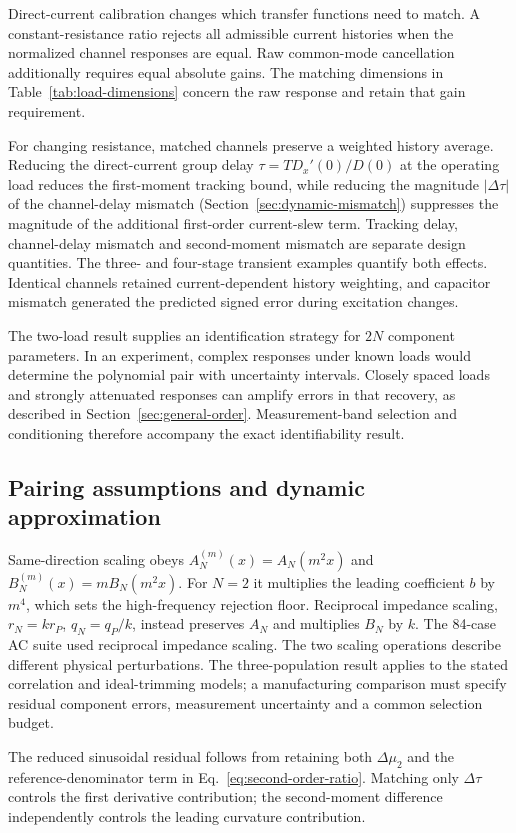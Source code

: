 Direct-current calibration changes which transfer functions need to match. A constant-resistance ratio rejects all admissible current histories when the normalized channel responses are equal. Raw common-mode cancellation additionally requires equal absolute gains. The matching dimensions in Table~\ref{tab:load-dimensions} concern the raw response and retain that gain requirement.

For changing resistance, matched channels preserve a weighted history average. Reducing the direct-current group delay $\tau=TD_x'(0)/D(0)$ at the operating load reduces the first-moment tracking bound, while reducing the magnitude $|\Delta\tau|$ of the channel-delay mismatch (Section~\ref{sec:dynamic-mismatch}) suppresses the magnitude of the additional first-order current-slew term. Tracking delay, channel-delay mismatch and second-moment mismatch are separate design quantities. The three- and four-stage transient examples quantify both effects. Identical channels retained current-dependent history weighting, and capacitor mismatch generated the predicted signed error during excitation changes.

The two-load result supplies an identification strategy for $2N$ component parameters. In an experiment, complex responses under known loads would determine the polynomial pair with uncertainty intervals. Closely spaced loads and strongly attenuated responses can amplify errors in that recovery, as described in Section~\ref{sec:general-order}. Measurement-band selection and conditioning therefore accompany the exact identifiability result.

\subsection{Pairing assumptions and dynamic approximation}

Same-direction scaling obeys $A_N^{(m)}(x)=A_N(m^2x)$ and $B_N^{(m)}(x)=mB_N(m^2x)$. For $N=2$ it multiplies the leading coefficient $b$ by $m^4$, which sets the high-frequency rejection floor. Reciprocal impedance scaling, $r_N=kr_P$, $q_N=q_P/k$, instead preserves $A_N$ and multiplies $B_N$ by $k$. The 84-case AC suite used reciprocal impedance scaling. The two scaling operations describe different physical perturbations. The three-population result applies to the stated correlation and ideal-trimming models; a manufacturing comparison must specify residual component errors, measurement uncertainty and a common selection budget.

The reduced sinusoidal residual follows from retaining both $\Delta\mu_2$ and the reference-denominator term in Eq.~\eqref{eq:second-order-ratio}. Matching only $\Delta\tau$ controls the first derivative contribution; the second-moment difference independently controls the leading curvature contribution.

